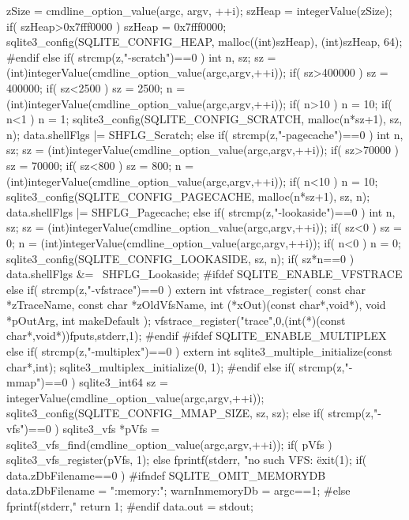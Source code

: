 \begin{Codex}[label=shell.c,numbers=left]
{{{      zSize = cmdline_option_value(argc, argv, ++i);
      szHeap = integerValue(zSize);
      if( szHeap>0x7fff0000 ) szHeap = 0x7fff0000;
      sqlite3_config(SQLITE_CONFIG_HEAP, malloc((int)szHeap), (int)szHeap, 64);
#endif
    }else if( strcmp(z,"-scratch")==0 ){
      int n, sz;
      sz = (int)integerValue(cmdline_option_value(argc,argv,++i));
      if( sz>400000 ) sz = 400000;
      if( sz<2500 ) sz = 2500;
      n = (int)integerValue(cmdline_option_value(argc,argv,++i));
      if( n>10 ) n = 10;
      if( n<1 ) n = 1;
      sqlite3_config(SQLITE_CONFIG_SCRATCH, malloc(n*sz+1), sz, n);
      data.shellFlgs |= SHFLG_Scratch;
    }else if( strcmp(z,"-pagecache")==0 ){
      int n, sz;
      sz = (int)integerValue(cmdline_option_value(argc,argv,++i));
      if( sz>70000 ) sz = 70000;
      if( sz<800 ) sz = 800;
      n = (int)integerValue(cmdline_option_value(argc,argv,++i));
      if( n<10 ) n = 10;
      sqlite3_config(SQLITE_CONFIG_PAGECACHE, malloc(n*sz+1), sz, n);
      data.shellFlgs |= SHFLG_Pagecache;
    }else if( strcmp(z,"-lookaside")==0 ){
      int n, sz;
      sz = (int)integerValue(cmdline_option_value(argc,argv,++i));
      if( sz<0 ) sz = 0;
      n = (int)integerValue(cmdline_option_value(argc,argv,++i));
      if( n<0 ) n = 0;
      sqlite3_config(SQLITE_CONFIG_LOOKASIDE, sz, n);
      if( sz*n==0 ) data.shellFlgs &= ~SHFLG_Lookaside;
#ifdef SQLITE_ENABLE_VFSTRACE
    }else if( strcmp(z,"-vfstrace")==0 ){
      extern int vfstrace_register(
         const char *zTraceName,
         const char *zOldVfsName,
         int (*xOut)(const char*,void*),
         void *pOutArg,
         int makeDefault
      );
      vfstrace_register("trace",0,(int(*)(const char*,void*))fputs,stderr,1);
#endif
#ifdef SQLITE_ENABLE_MULTIPLEX
    }else if( strcmp(z,"-multiplex")==0 ){
      extern int sqlite3_multiple_initialize(const char*,int);
      sqlite3_multiplex_initialize(0, 1);
#endif
    }else if( strcmp(z,"-mmap")==0 ){
      sqlite3_int64 sz = integerValue(cmdline_option_value(argc,argv,++i));
      sqlite3_config(SQLITE_CONFIG_MMAP_SIZE, sz, sz);
    }else if( strcmp(z,"-vfs")==0 ){
      sqlite3_vfs *pVfs = sqlite3_vfs_find(cmdline_option_value(argc,argv,++i));
      if( pVfs ){
        sqlite3_vfs_register(pVfs, 1);
      }else{
        fprintf(stderr, "no such VFS: \"%
        exit(1);
      }
    }
  }
  if( data.zDbFilename==0 ){
#ifndef SQLITE_OMIT_MEMORYDB
    data.zDbFilename = ":memory:";
    warnInmemoryDb = argc==1;
#else
    fprintf(stderr,"%
    return 1;
#endif
  }
  data.out = stdout;

}
\end{Codex}
